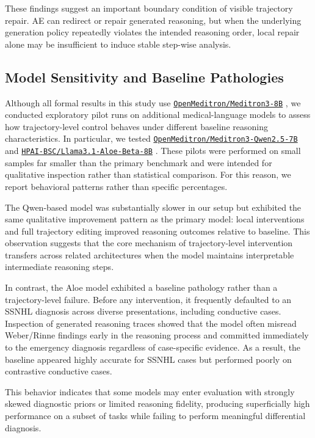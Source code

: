 \documentclass[twocolumn]{article}
\newcommand{\hfmodel}[1]{%
  \href{https://huggingface.co/#1}{\nolinkurl{#1}}%
}
\begin{document}
These findings suggest an important boundary condition of visible trajectory
repair. AE can redirect or repair generated reasoning, but when the underlying
generation policy repeatedly violates the intended reasoning order, local repair
alone may be insufficient to induce stable step-wise analysis.

\subsection{Model Sensitivity and Baseline
Pathologies}\label{sec:model_sensitivity}

Although all formal results in this study use
\hfmodel{OpenMeditron/Meditron3-8B}, we conducted exploratory pilot %
runs on additional medical-language models to assess how trajectory-level
control behaves under different baseline reasoning characteristics. In
particular, we tested \hfmodel{OpenMeditron/Meditron3-Qwen2.5-7B} and %
\hfmodel{HPAI-BSC/Llama3.1-Aloe-Beta-8B}. These pilots were performed on small
samples far smaller than the primary benchmark and were intended for qualitative
inspection rather than statistical comparison. For this reason, we report
behavioral patterns rather than specific percentages.

The Qwen-based model was substantially slower in our setup but exhibited the
same qualitative improvement pattern as the primary model: local interventions
and full trajectory editing improved reasoning outcomes relative to baseline.
This observation suggests that the core mechanism of trajectory-level
intervention transfers across related architectures when the model maintains
interpretable intermediate reasoning steps.

In contrast, the Aloe model exhibited a baseline pathology rather than a
trajectory-level failure. Before any intervention, it frequently defaulted to an
SSNHL diagnosis across diverse presentations, including conductive cases.
Inspection of generated reasoning traces showed that the model often misread
Weber/Rinne findings early in the reasoning process and committed immediately to
the emergency diagnosis regardless of case-specific evidence. As a result, the
baseline appeared highly accurate for SSNHL cases but performed poorly on
contrastive conductive cases.

This behavior indicates that some models may enter evaluation with strongly
skewed diagnostic priors or limited reasoning fidelity, producing superficially
high performance on a subset of tasks while failing to perform meaningful
differential diagnosis.
\end{document}
